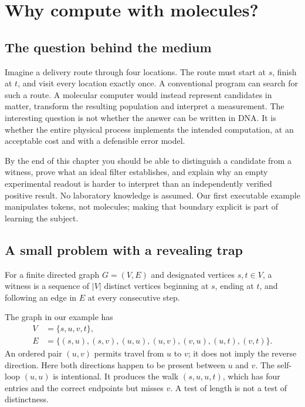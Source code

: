 \chapter{Why compute with molecules?}
\label{ch:why-molecules}

\section*{The question behind the medium}
Imagine a delivery route through four locations. The route must start at $s$,
finish at $t$, and visit every location exactly once. A conventional program
can search for such a route. A molecular computer would instead represent
candidates in matter, transform the resulting population and interpret a
measurement. The interesting question is not whether the answer can be written
in DNA. It is whether the entire physical process implements the intended
computation, at an acceptable cost and with a defensible error model.

By the end of this chapter you should be able to distinguish a candidate from
a witness, prove what an ideal filter establishes, and explain why an empty
experimental readout is harder to interpret than an independently verified
positive result. No laboratory knowledge is assumed. Our first executable
example manipulates tokens, not molecules; making that boundary explicit is
part of learning the subject.

\section{A small problem with a revealing trap}
\begin{definition}
For a finite directed graph $G=(V,E)$ and designated vertices $s,t\in V$, a
witness is a sequence of $|V|$ distinct vertices beginning at $s$, ending at
$t$, and following an edge in $E$ at every consecutive step.
\end{definition}
The graph in our example has
\begin{align*}
 V &= \{s,u,v,t\},\\
 E &= \{(s,u),(s,v),(u,u),(u,v),(v,u),(u,t),(v,t)\}.
\end{align*}
An ordered pair $(u,v)$ permits travel from $u$ to $v$; it does not imply the
reverse direction. Here both directions happen to be present between $u$ and
$v$. The self-loop $(u,u)$ is intentional. It produces the walk $(s,u,u,t)$,
which has four entries and the correct endpoints but misses $v$. A test of
length is not a test of distinctness.

